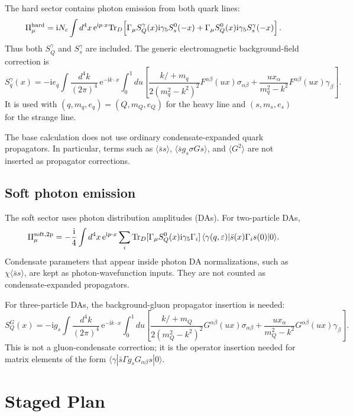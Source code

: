 \documentclass[11pt]{article}
\newcommand{\ii}{\mathrm{i}}
\newcommand{\ee}{\mathrm{e}}
\newcommand{\Tr}{\mathrm{Tr}}
\newcommand{\slashp}[1]{#1\!\!\!/}
\begin{document}
The hard sector contains photon emission from both quark lines:
\[
  \Pi_\mu^{\rm hard}
  =
  \ii N_c\int d^4x\,\ee^{\ii p\cdot x}
  \Tr_D\!\left[
    \Gamma_\mu S_Q^\gamma(x)\ii\gamma_5S_s^0(-x)
    +
    \Gamma_\mu S_Q^0(x)\ii\gamma_5S_s^\gamma(-x)
  \right].
\]
Thus both $S_Q^\gamma$ and $S_s^\gamma$ are included.  The generic
electromagnetic background-field correction is
\[
  S_q^\gamma(x)
  =
  -\ii e_q
  \int\frac{d^4k}{(2\pi)^4}\,\ee^{-\ii k\cdot x}
  \int_0^1du
  \left[
    \frac{\slashp{k}+m_q}{2(m_q^2-k^2)^2}
    F^{\alpha\beta}(ux)\sigma_{\alpha\beta}
    +
    \frac{u x_\alpha}{m_q^2-k^2}
    F^{\alpha\beta}(ux)\gamma_\beta
  \right].
\]
It is used with $(q,m_q,e_q)=(Q,m_Q,e_Q)$ for the heavy line and
$(s,m_s,e_s)$ for the strange line.

The base calculation does not use ordinary condensate-expanded quark
propagators.  In particular, terms such as
$\langle\bar s s\rangle$, $\langle\bar s g_s\sigma Gs\rangle$, and
$\langle G^2\rangle$ are not inserted as propagator corrections.

\subsection{Soft photon emission}

The soft sector uses photon distribution amplitudes (DAs).  For two-particle
DAs,
\[
  \Pi_\mu^{\rm soft,2p}
  =
  -\frac{\ii}{4}\int d^4x\,\ee^{\ii p\cdot x}
  \sum_i
  \Tr_D[\Gamma_\mu S_Q^0(x)\ii\gamma_5\Gamma_i]\,
  \langle\gamma(q,\varepsilon)|
  \bar s(x)\Gamma_i s(0)
  |0\rangle .
\]
Condensate parameters that appear inside photon DA normalizations, such as
$\chi\langle\bar s s\rangle$, are kept as photon-wavefunction inputs.  They are
not counted as condensate-expanded propagators.

For three-particle DAs, the background-gluon propagator insertion is needed:
\[
  S_Q^G(x)
  =
  -\ii g_s
  \int\frac{d^4k}{(2\pi)^4}\,\ee^{-\ii k\cdot x}
  \int_0^1du
  \left[
    \frac{\slashp{k}+m_Q}{2(m_Q^2-k^2)^2}
    G^{\alpha\beta}(ux)\sigma_{\alpha\beta}
    +
    \frac{u x_\alpha}{m_Q^2-k^2}
    G^{\alpha\beta}(ux)\gamma_\beta
  \right].
\]
This is not a gluon-condensate correction; it is the operator insertion needed
for matrix elements of the form
$\langle\gamma|\bar s\Gamma g_sG_{\alpha\beta}s|0\rangle$.

\section{Staged Plan}
\end{document}

